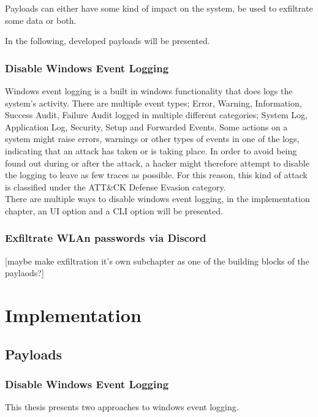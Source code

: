 Payloads can either have some kind of impact on the system, be used to exfiltrate some data or both.

In the following, developed payloads will be presented.

\subsubsection{Disable Windows Event Logging}

Windows event logging is a built in windows functionality that does logs the system's activity. There are multiple event types; Error, Warning, Information, Success Audit, Failure Audit logged in multiple different categories; System Log, Application Log, Security, Setup and Forwarded Events. 
Some actions on a system might raise errors, warnings or other types of events in one of the logs, indicating that an attack has taken or is taking place. In order to avoid being found out during or after the attack, a hacker might therefore attempt to disable the logging to leave as few traces as possible. For this reason, this kind of attack is classified under the ATT\&CK Defense Evasion category. \\
There are multiple ways to disable windows event logging, in the implementation chapter, an UI option and a CLI option will be presented. 


\subsubsection{Exfiltrate WLAn passwords via Discord}

[maybe make exfiltration it's own subchapter as one of the building blocks of the paylaods?]



\section{Implementation} \label{Implementation}

\subsection{Payloads}

\subsubsection{Disable Windows Event Logging}

This thesis presents two approaches to windows event logging.

